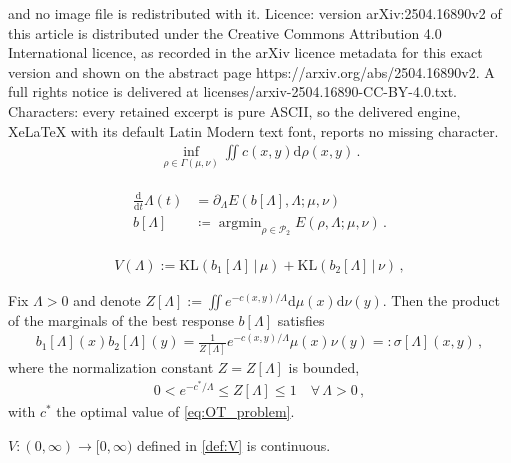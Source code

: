 \documentclass[10pt,a4paper]{amsart}
\newcommand{\KL}[2]{\text{KL}(#1\,|\,#2)}
\def\P{\mathcal P}
\DeclareMathOperator*{\amin}{argmin}
\renewcommand{\d}{\mathrm{d}}
\newcommand{\ddt}{\frac{\d}{\d t}}
\begin{document}
and no image file is redistributed with it. Licence: version arXiv:2504.16890v2 of this article is distributed under the Creative Commons Attribution 4.0 International licence, as recorded in the arXiv licence metadata for this exact version and shown on the abstract page https://arxiv.org/abs/2504.16890v2. A full rights notice is delivered at licenses/arxiv-2504.16890-CC-BY-4.0.txt. Characters: every retained excerpt is pure ASCII, so the delivered engine, XeLaTeX with its default Latin Modern text font, reports no missing character.
\begin{align}\label{eq:OT_problem}
    \inf_{\rho\in\Gamma(\mu,\nu)} \iint c(x,y)\d \rho(x,y)\,.
\end{align}

\begin{align}\label{eq:best_response_dynamics}
\begin{split}
        \ddt \Lambda(t) &= \partial_\Lambda  E(b[\Lambda],\Lambda;\mu,\nu) \\
    b[\Lambda] &\coloneqq \amin_{\rho\in\P_2} E(\rho,\Lambda;\mu,\nu) \,.
\end{split}
\end{align}

\begin{align}\label{def:V}
   V(\Lambda):=\KL{b_1[\Lambda]}{\mu} + \KL{b_2[\Lambda]}{\nu}\,,
\end{align}

\begin{lemma}\label{lem:best-response-marginals}
Fix $\Lambda>0$ and denote $Z[\Lambda]:= \iint e^{-c(x,y)/\Lambda}\d\mu(x)\d\nu(y)$. Then the product of the marginals of the best response $b[\Lambda]$ satisfies
\begin{align}\label{eq:EL}
    b_1[\Lambda](x)b_2[\Lambda](y)
    =\frac{1}{Z[\Lambda]}e^{-c(x,y)/\Lambda}\mu(x)\nu(y)=:\sigma[\Lambda](x,y)\,,
\end{align}
where the normalization constant $Z=Z[\Lambda]$ is bounded,
\begin{align}\label{eq:Z}
    0<e^{-c^*/\Lambda} \le Z[\Lambda]\le 1 \quad \forall \,\Lambda>0\,,
\end{align}
with $c^*$ the optimal value of \eqref{eq:OT_problem}.
\end{lemma}

\begin{lemma}[Continuity of $V$]\label{lem:continuity_V}
    $V:(0,\infty)\to[0,\infty)$ defined in \eqref{def:V} is continuous.
\end{lemma}
\end{document}
